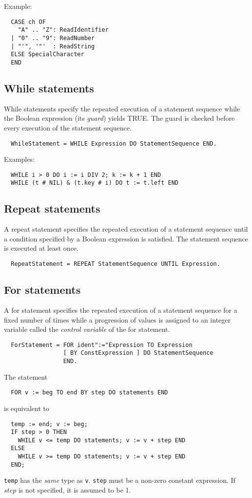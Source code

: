 \noindent
Example:
\begin{verbatim}
  CASE ch OF
    "A" .. "Z": ReadIdentifier
  | "0" .. "9": ReadNumber
  | "'", '"'  : ReadString
  ELSE SpecialCharacter
  END
\end{verbatim}

\subsection{While statements}

While statements specify the repeated execution of a statement sequence
while the Boolean expression (its {\em guard}) yields TRUE. The guard
is checked before every execution of the statement sequence.
{\BNFsize
\begin{verbatim}
  WhileStatement = WHILE Expression DO StatementSequence END.
\end{verbatim}}

\noindent
Examples:
\begin{verbatim}
  WHILE i > 0 DO i := i DIV 2; k := k + 1 END
  WHILE (t # NIL) & (t.key # i) DO t := t.left END
\end{verbatim}

\subsection{Repeat statements}

A repeat statement specifies the repeated execution of a statement
sequence until a condition specified by a Boolean expression is satisfied.
The statement sequence is executed at least once.
{\BNFsize
\begin{verbatim}
  RepeatStatement = REPEAT StatementSequence UNTIL Expression.
\end{verbatim}}

\subsection{For statements}

A for statement specifies the repeated execution of a statement sequence
for a fixed number of times while a progression of values is assigned
to an integer variable called the {\em control variable} of the for
statement.
{\BNFsize
\begin{verbatim}
  ForStatement = FOR ident":="Expression TO Expression
                 [ BY ConstExpression ] DO StatementSequence
                 END.
\end{verbatim}}
The statement
\begin{verbatim}
  FOR v := beg TO end BY step DO statements END
\end{verbatim}
is equivalent to
\begin{verbatim}
  temp := end; v := beg;
  IF step > 0 THEN
    WHILE v <= temp DO statements; v := v + step END
  ELSE
    WHILE v >= temp DO statements; v := v + step END
  END;
\end{verbatim}
{\tt temp} has the {\em same} type as {\tt v}.
{\tt step} must be a non-zero constant expression.
If $step$ is not specified, it is assumed to be 1.

